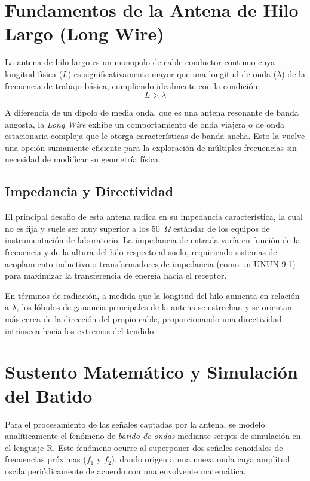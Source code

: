 \documentclass[runningheads]{llncs}
\begin{document}
\section{Fundamentos de la Antena de Hilo Largo (Long Wire)}
La antena de hilo largo es un monopolo de cable conductor continuo cuya longitud física ($L$) es significativamente mayor que una longitud de onda ($\lambda$) de la frecuencia de trabajo básica, cumpliendo idealmente con la condición:
\begin{equation}
L > \lambda
\end{equation}

A diferencia de un dipolo de media onda, que es una antena resonante de banda angosta, la \textit{Long Wire} exhibe un comportamiento de onda viajera o de onda estacionaria compleja que le otorga características de banda ancha. Esto la vuelve una opción sumamente eficiente para la exploración de múltiples frecuencias sin necesidad de modificar su geometría física.

\subsection{Impedancia y Directividad}
El principal desafío de esta antena radica en su impedancia característica, la cual no es fija y suele ser muy superior a los 50~$\Omega$ estándar de los equipos de instrumentación de laboratorio. La impedancia de entrada varía en función de la frecuencia y de la altura del hilo respecto al suelo, requiriendo sistemas de acoplamiento inductivo o transformadores de impedancia (como un UNUN 9:1) para maximizar la transferencia de energía hacia el receptor.

En términos de radiación, a medida que la longitud del hilo aumenta en relación a $\lambda$, los lóbulos de ganancia principales de la antena se estrechan y se orientan más cerca de la dirección del propio cable, proporcionando una directividad intrínseca hacia los extremos del tendido.

\section{Sustento Matemático y Simulación del Batido}
Para el procesamiento de las señales captadas por la antena, se modeló analíticamente el fenómeno de \textit{batido de ondas} mediante scripts de simulación en el lenguaje R. Este fenómeno ocurre al superponer dos señales senoidales de frecuencias próximas ($f_1$ y $f_2$), dando origen a una nueva onda cuya amplitud oscila periódicamente de acuerdo con una envolvente matemática. 
\end{document}
